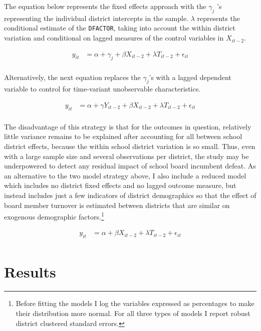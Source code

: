 The equation below represents the fixed effects approach with the
$\gamma_{j}$ 's representing the individual district intercepts in the sample. 
$\lambda$ represents the conditional estimate of the \texttt{DFACTOR}, taking into 
account the within district variation and conditional on lagged measures of the 
control variables in $X_{it-2}$. 

\begin{align*} 
y_{it} &= \alpha + \gamma_{j} + \beta X_{it-2} + \lambda T_{it-2} + \epsilon_{it} \\ \end{align*}

Alternatively, the next equation replaces the $\gamma_{j}$'s with a lagged 
dependent variable to control for time-variant unobservable characteristics. 

\begin{align*} 
y_{it} &= \alpha + \gamma Y_{it-2} + \beta X_{it-2} + \lambda T_{it-2} + \epsilon_{it} \\ \end{align*}

The disadvantage of this 
strategy is that for the outcomes in question, relatively little variance 
remains to be explained after accounting for all between school district effects, 
because the within school district variation is so small. Thus, even with a large
sample size and several observations per district, the study may be underpowered 
to detect any residual impact of school board incumbent defeat. As an alternative 
to the two model strategy above, I also include a reduced model 
which includes no district fixed effects and no lagged outcome measure, but instead 
includes just a few indicators of district demographics so that the effect of 
board member turnover is estimated between districts that are similar on exogenous 
demographic factors.\footnote{Before fitting the models I log the variables 
expressed as percentages to make their distribution more normal. For all three 
types of models I report robust district clustered standard errors.}

\begin{align*} 
y_{it} &= \alpha +  \beta X_{it-2} + \lambda T_{it-2} + \epsilon_{it}  \\ 
\end{align*}


\section{Results}

